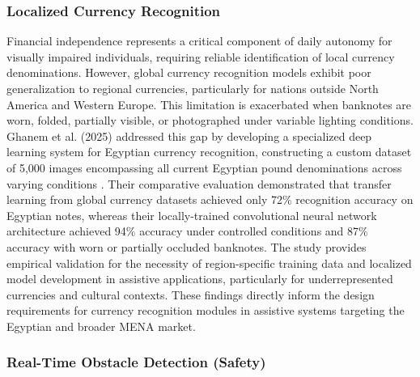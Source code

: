 \documentclass[a4paper]{report}
\begin{document}
\subsubsection{Localized Currency Recognition}

Financial independence represents a critical component of daily autonomy for visually impaired individuals, requiring reliable identification of local currency denominations. However, global currency recognition models exhibit poor generalization to regional currencies, particularly for nations outside North America and Western Europe. This limitation is exacerbated when banknotes are worn, folded, partially visible, or photographed under variable lighting conditions. Ghanem et al. (2025) addressed this gap by developing a specialized deep learning system for Egyptian currency recognition, constructing a custom dataset of 5,000 images encompassing all current Egyptian pound denominations across varying conditions \cite{ghanem2025currency}. Their comparative evaluation demonstrated that transfer learning from global currency datasets achieved only 72\% recognition accuracy on Egyptian notes, whereas their locally-trained convolutional neural network architecture achieved 94\% accuracy under controlled conditions and 87\% accuracy with worn or partially occluded banknotes. The study provides empirical validation for the necessity of region-specific training data and localized model development in assistive applications, particularly for underrepresented currencies and cultural contexts. These findings directly inform the design requirements for currency recognition modules in assistive systems targeting the Egyptian and broader MENA market.

\subsubsection{Real-Time Obstacle Detection (Safety)}
\end{document}
